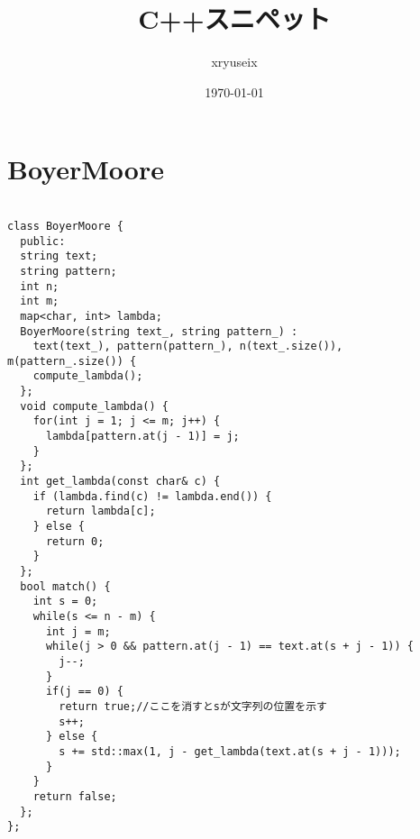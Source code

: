\documentclass[a4j,titlepage]{jarticle} %
\title{C++スニペット}
\author{xryuseix}
\date{\today}
\begin{document}
\maketitle

\tableofcontents%
\clearpage



\color{white}
\section{BoyerMoore}
\color{black}
\begin{lstlisting}[caption=BoyerMoore]

class BoyerMoore {
  public:
  string text;
  string pattern;
  int n;
  int m;
  map<char, int> lambda;
  BoyerMoore(string text_, string pattern_) : 
    text(text_), pattern(pattern_), n(text_.size()), m(pattern_.size()) {
    compute_lambda();
  };
  void compute_lambda() {
    for(int j = 1; j <= m; j++) {
      lambda[pattern.at(j - 1)] = j;
    }
  };
  int get_lambda(const char& c) {
    if (lambda.find(c) != lambda.end()) {
      return lambda[c];
    } else {
      return 0;
    }
  };
  bool match() {
    int s = 0;
    while(s <= n - m) {
      int j = m;
      while(j > 0 && pattern.at(j - 1) == text.at(s + j - 1)) {
        j--;
      }
      if(j == 0) {
        return true;//ここを消すとsが文字列の位置を示す
        s++;
      } else {
        s += std::max(1, j - get_lambda(text.at(s + j - 1)));
      }
    }
    return false;
  };
};

\end{lstlisting}

\color{white}
\end{document}
